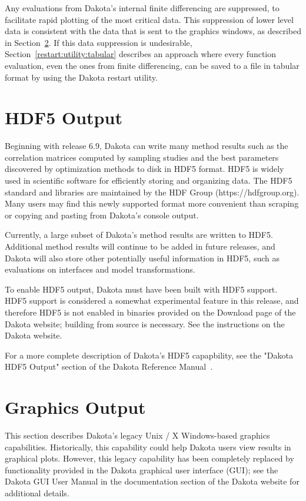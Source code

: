 Any evaluations from Dakota's internal finite differencing are
suppressed, to facilitate rapid plotting of the most critical data.
This suppression of lower level data is consistent with the data that
is sent to the graphics windows, as described in
Section~\ref{output:graphics}. If this data suppression is
undesirable, Section~\ref{restart:utility:tabular} describes an
approach where every function evaluation, even the ones from finite
differencing, can be saved to a file in tabular format by using the
Dakota restart utility.

\section{HDF5 Output}\label{output:hdf5}

Beginning with release 6.9, Dakota can write many method results such as the 
correlation matrices computed by sampling studies and the best parameters 
discovered by optimization methods to disk in HDF5 format. HDF5 is widely used 
in scientific software for efficiently storing and organizing data. The HDF5 
standard and libraries are maintained by the HDF Group (https://hdfgroup.org).
Many users may find this newly supported format more convenient than scraping 
or copying and pasting from Dakota's console output.

Currently, a large subset of Dakota's method results are
written to HDF5. Additional method results will continue to be added in future
releases, and Dakota will also store other potentially useful information in 
HDF5, such as evaluations on interfaces and model transformations.

To enable HDF5 output, Dakota must have been built with HDF5 support. HDF5 
support is considered a somewhat experimental feature in this release, and therefore 
HDF5 is not enabled in binaries provided on the Download page of the Dakota
website; building from source is necessary. See the instructions on
the Dakota website.

For a more complete description of Dakota's HDF5 capapbility, see the "Dakota
HDF5 Output" section of the Dakota Reference Manual~\cite{RefMan}.

\section{Graphics Output}\label{output:graphics}

This section describes Dakota's legacy Unix / X Windows-based graphics
capabilities.  Historically, this capability could help Dakota users
view results in graphical plots.  However, this legacy capability has
been completely replaced by functionality provided in the Dakota
graphical user interface (GUI); see the Dakota GUI User Manual in the
documentation section of the Dakota website for additional details.

